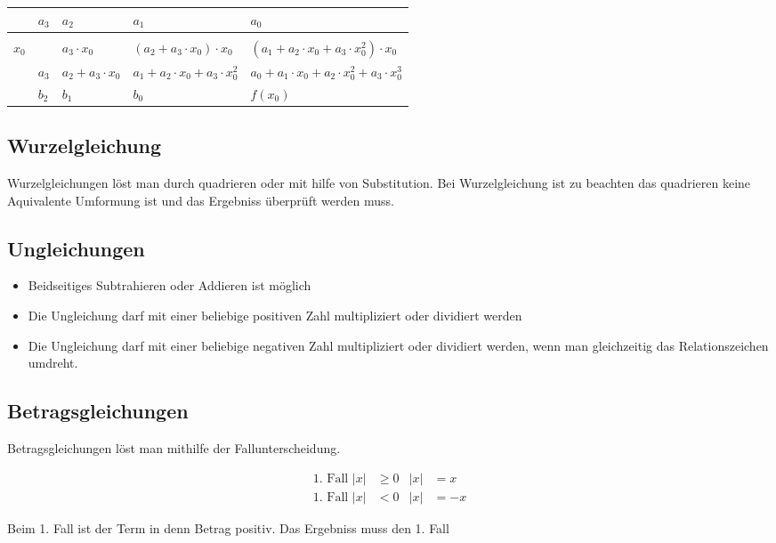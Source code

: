 \begin{tabularx}{\linewidth}{l|XXXX}
& $a_3$ & $a_2$ & $a_1$ & $a_0$\\
\hline \\
$x_0$ & & $a_3\cdot x_0$ & $(a_2+a_3\cdot x_0)\cdot x_0$ &$(a_1+a_2\cdot x_0 +a_3\cdot x_0^2)\cdot x_0$ \\
& $a_3$ & $a_2+a_3\cdot x_0$ & $a_1+a_2\cdot x_0 + a_3\cdot x_0^2$ & $a_0+a_1\cdot x_0+a_2\cdot x_0^2+a_3\cdot x_0^3$\\
\hline
& $b_2$ & $b_1$ & $b_0$& $f(x_0)$
\end{tabularx}
\subsection{Wurzelgleichung}
Wurzelgleichungen löst man durch quadrieren oder mit hilfe von Substitution.
Bei Wurzelgleichung ist zu beachten das quadrieren keine Aquivalente Umformung ist und das 
Ergebniss überprüft werden muss.

\subsection{Ungleichungen}
\begin{itemize}
\item Beidseitiges Subtrahieren oder Addieren ist möglich
\item Die Ungleichung darf mit einer beliebige positiven Zahl multipliziert oder dividiert werden
\item Die Ungleichung darf mit einer beliebige negativen Zahl multipliziert oder dividiert werden, wenn man gleichzeitig das Relationszeichen umdreht.
\end{itemize}

\subsection{Betragsgleichungen}
Betragsgleichungen löst man mithilfe der Fallunterscheidung.
\begin{shaded}
\begin{align}
 \text{1. Fall } |x|&\geq0& |x|&=x\\
 \text{1. Fall } |x|&<0& |x|&=-x
 \end{align}
\end{shaded}
Beim 1. Fall ist der Term in denn Betrag positiv. Das Ergebniss muss den 1. Fall 